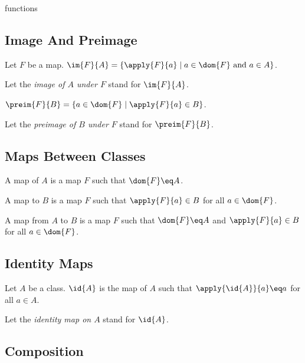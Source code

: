 \documentclass{naproche-library}
\begin{document}
\begin{smodule}{functions}
\subsection{Image And Preimage}

\begin{definition*}[forthel,id=ImageDef]
  Let $F$ be a map.
  $\im{F}{A}=\{\apply{F}{a}\mid a\in\dom{F}\text{ and }a\in A\}$.

  Let the \emph{image of $A$ under $F$} stand for $\im{F}{A}$.
\end{definition*}

\begin{definition*}[forthel,id=PreimageDef]
  $\preim{F}{B}=\{a\in\dom{F}\mid \apply{F}{a}\in B\}$.

  Let the \emph{preimage of $B$ under $F$} stand for $\preim{F}{B}$.
\end{definition*}


\subsection{Maps Between Classes}

\begin{definition*}[forthel,id=MapFromDef]
  A map of $A$ is a map $F$ such that $\dom{F}\eq A$.
\end{definition*}

\begin{definition*}[forthel,id=MapToDef]
  A map to $B$ is a map $F$ such that $\apply{F}{a}\in B$ for all $a\in\dom{F}$.
\end{definition*}

\begin{definition*}[forthel,id=MapFromToDef]
  A map from $A$ to $B$ is a map $F$ such that $\dom{F}\eq A$ and $\apply{F}{a}\in B$ for all $a\in\dom{F}$.
\end{definition*}


\subsection{Identity Maps}

\begin{definition*}[forthel,id=IdentityMapDef]
  Let $A$ be a class.
  $\id{A}$ is the map of $A$ such that $\apply{\id{A}}{a}\eq a$ for all $a\in A$.

  Let the \emph{identity map on $A$} stand for $\id{A}$.
\end{definition*}


\subsection{Composition}


\end{smodule}
\end{document}
